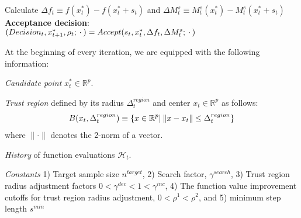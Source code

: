 \begin{algorithm}[H]
{        
         Calculate $\Delta f_t\equiv f(x_t^*) - f(x_t^*+s_t)$ and $\Delta M^{s}_t\equiv M_t^s(x_t^*) - M_t^s(x_t^*+s_t)$\\
         \nonl \textbf{Acceptance decision}:\\
         $(Decision_t,x_{t+1}^*,\rho_t;\hspace{0.2em}\cdot\hspace{0.2em}) =  Accept(s_t,x_t^{*},\Delta f_t,\Delta M_t^s;\hspace{0.2em}\cdot\hspace{0.2em})$\\
    }

    \end{algorithm}

\newpage
At the beginning of every iteration, we are equipped with the following information:

\textit{Candidate point} $x_t^*\in\mathbb{R}^p$.

\textit{Trust region} defined by its radius $\Delta_t^{region}$ and center $x_t\in\mathbb{R}^p$ as follows:
\begin{align}
    B(x_t,\Delta_t^{region})\equiv\{x\in\mathbb{R}^p|\hspace{0.2em}\lVert x-x_t\rVert\leq\Delta_t^{region}\}
    \label{eq:def-trustregion}
\end{align}
where $\lVert\cdot\rVert$ denotes the 2-norm of a vector.

\textit{History} of function evaluations $\mathcal{H}_t$.

\textit{Constants} 1) Target sample size $n^{target}$, 2) Search factor, $\gamma^{search}$, 3) Trust region radius adjustment factors $0<\gamma^{dec}<1<\gamma^{inc}$, 4) The function value improvement cutoffs for trust region radius adjustment, $0<\rho^1<\rho^2$, and 5) minimum step length $s^{min}$

